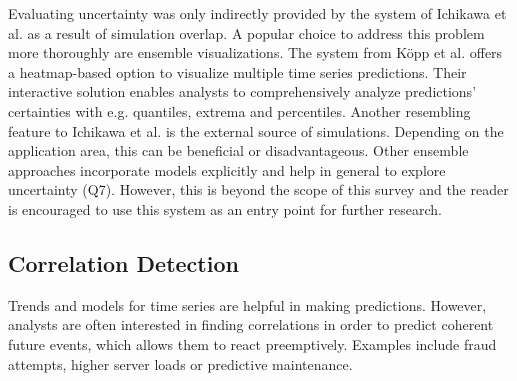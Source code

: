 \documentclass[electronic]{vgtc}             %
\begin{document}
Evaluating uncertainty was only indirectly provided by the system of Ichikawa et al. \cite{ichikawa:2002} as a result of simulation overlap.
A popular choice to address this problem more thoroughly are ensemble visualizations.
The system from K\"opp et al. \cite{koepp:2014} offers a heatmap-based option to visualize multiple time series predictions. 
Their interactive solution enables analysts to comprehensively analyze predictions' certainties with e.g. quantiles, extrema and percentiles. 
Another resembling feature to Ichikawa et al. \cite{ichikawa:2002} is the external source of simulations. 
Depending on the application area, this can be beneficial or disadvantageous. 
Other ensemble approaches incorporate models explicitly and help in general to explore uncertainty (Q7).
However, this is beyond the scope of this survey and the reader is encouraged to use this system as an entry point for further research. 

\subsection{Correlation Detection\label{subsec:correlation}}
Trends and models for time series are helpful in making predictions.  
However, analysts are often interested in finding correlations in order to predict coherent future events, which allows them to react preemptively. 
Examples include fraud attempts, higher server loads or predictive maintenance.
\end{document}
